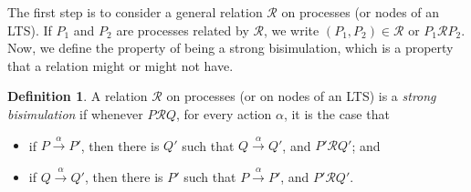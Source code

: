 \documentclass[a4paper, openany]{memoir}
\theoremstyle{definition}
\newtheorem{definition}[proposition]{Definition}
\begin{document}
    The first step is to consider a general relation $\mathcal{R}$ on processes (or nodes of an LTS). If $P_1$ and $P_2$ are processes related by $\mathcal{R}$, we write $(P_1, P_2) \in \mathcal{R}$ or $P_1 \mathcal{R} P_2$. Now, we define the property of being a strong bisimulation, which is a property that a relation might or might not have.
    \begin{definition}
        A relation $\mathcal{R}$ on processes (or on nodes of an LTS) is a \emph{strong bisimulation} if whenever $P \mathcal{R} Q$, for every action $\alpha$, it is the case that
        \begin{itemize}
            \item if $P \xrightarrow{\alpha} P'$, then there is $Q'$ such that $Q \xrightarrow{\alpha} Q'$, and $P' \mathcal{R} Q'$; and
            \item if $Q \xrightarrow{\alpha} Q'$, then there is $P'$ such that $P \xrightarrow{\alpha} P'$, and $P' \mathcal{R} Q'$.
        \end{itemize}
    \end{definition}
\end{document}
